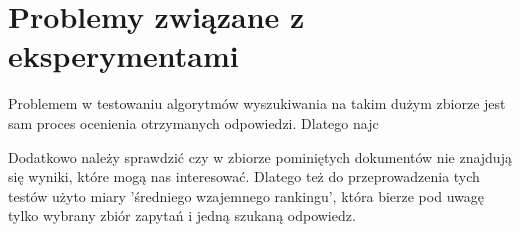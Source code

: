 \section{Problemy związane z eksperymentami}



Problemem w testowaniu algorytmów wyszukiwania na takim dużym zbiorze jest sam proces ocenienia otrzymanych odpowiedzi. Dlatego najc



 Dodatkowo
należy sprawdzić czy w zbiorze pominiętych dokumentów nie znajdują się
wyniki, które mogą nas interesować. Dlatego też do przeprowadzenia
tych testów użyto miary 'średniego wzajemnego rankingu', która bierze
pod uwagę tylko wybrany zbiór zapytań i jedną szukaną odpowiedz.



